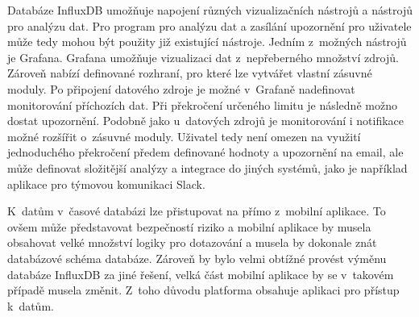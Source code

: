 Databáze InfluxDB umožňuje napojení různých vizualizačních nástrojů a nástrojů pro analýzu dat. Pro program pro analýzu dat a zasílání upozornění pro uživatele může tedy mohou být použity již existující nástroje. Jedním z~možných nástrojů je Grafana. Grafana umožňuje vizualizaci dat z~nepřeberného množství zdrojů. Zároveň nabízí definované rozhraní, pro které lze vytvářet vlastní zásuvné moduly. Po připojení datového zdroje je možné v~Grafaně nadefinovat monitorování příchozích dat. Při překročení určeného limitu je následně možno dostat upozornění. Podobně jako u~datových zdrojů je monitorování i notifikace možné rozšířit o~zásuvné moduly. Uživatel tedy není omezen na využití jednoduchého překročení předem definované hodnoty a upozornění na email, ale může definovat složitější analýzy a integrace do jiných systémů, jako je například aplikace pro týmovou komunikaci Slack. 

\label{spec:flask_api}
K~datům v~časové databázi lze přistupovat na přímo z~mobilní aplikace. To ovšem může představovat bezpečností riziko a mobilní aplikace by musela obsahovat velké množství logiky pro dotazování a musela by dokonale znát databázové schéma databáze. Zároveň by bylo velmi obtížné provést výměnu databáze InfluxDB za jiné řešení, velká část mobilní aplikace by se v~takovém případě musela změnit. Z~toho důvodu platforma obsahuje aplikaci pro přístup k~datům.

